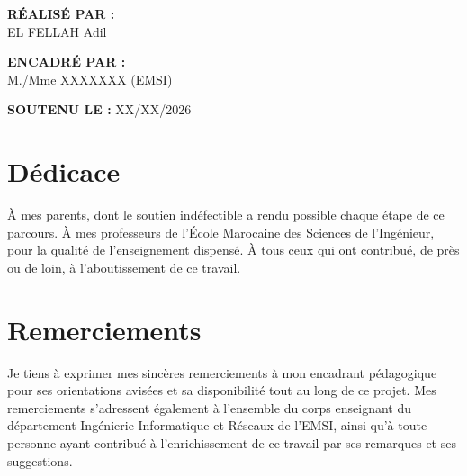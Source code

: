 \documentclass[12pt,a4paper]{report}
\begin{document}
\begin{titlepage}
\begin{center}
        \vspace{2cm}

        \begin{minipage}{0.45\textwidth}
            \textbf{RÉALISÉ PAR :}\\
            EL FELLAH Adil
        \end{minipage}
        \hfill
        \begin{minipage}{0.45\textwidth}
            \textbf{ENCADRÉ PAR :}\\
            M./Mme XXXXXXX (EMSI)
        \end{minipage}

        \vspace{1cm}

        \textbf{SOUTENU LE :} XX/XX/2026

    \end{center}
\end{titlepage}


\setcounter{page}{2}


\chapter*{Dédicace}

À mes parents, dont le soutien indéfectible a rendu possible chaque étape
de ce parcours. À mes professeurs de l'École Marocaine des Sciences de
l'Ingénieur, pour la qualité de l'enseignement dispensé. À tous ceux qui
ont contribué, de près ou de loin, à l'aboutissement de ce travail.

\clearpage


\chapter*{Remerciements}

Je tiens à exprimer mes sincères remerciements à mon encadrant pédagogique
pour ses orientations avisées et sa disponibilité tout au long de ce projet.
Mes remerciements s'adressent également à l'ensemble du corps enseignant du
département Ingénierie Informatique et Réseaux de l'EMSI, ainsi qu'à toute
personne ayant contribué à l'enrichissement de ce travail par ses remarques
et ses suggestions.
\end{document}
